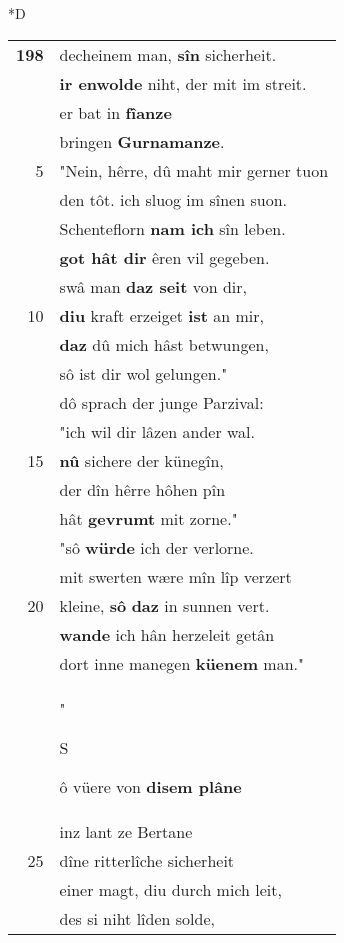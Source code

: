 \documentclass[8pt,a4paper,notitlepage]{article}
\begin{document}
\begin{table}[ht]
\begin{minipage}[t]{0.5\linewidth}
\small
\begin{center}*D
\end{center}
\begin{tabular}{rl}
\textbf{198} & decheinem man, \textbf{sîn} sicherheit.\\ 
 & \textbf{ir enwolde} niht, der mit im streit.\\ 
 & er bat in \textbf{fîanze}\\ 
 & bringen \textbf{Gurnamanze}.\\ 
5 & "Nein, hêrre, dû maht mir gerner tuon\\ 
 & den tôt. ich sluog im sînen suon.\\ 
 & Schenteflorn \textbf{nam ich} sîn leben.\\ 
 & \textbf{got hât dir} êren vil gegeben.\\ 
 & swâ man \textbf{daz seit} von dir,\\ 
10 & \textbf{diu} kraft erzeiget \textbf{ist} an mir,\\ 
 & \textbf{daz} dû mich hâst betwungen,\\ 
 & sô ist dir wol gelungen."\\ 
 & dô sprach der junge Parzival:\\ 
 & "ich wil dir lâzen ander wal.\\ 
15 & \textbf{nû} sichere der künegîn,\\ 
 & der dîn hêrre hôhen pîn\\ 
 & hât \textbf{gevrumt} mit zorne."\\ 
 & "sô \textbf{würde} ich der verlorne.\\ 
 & mit swerten wære mîn lîp verzert\\ 
20 & kleine, \textbf{sô} \textbf{daz} in sunnen vert.\\ 
 & \textbf{wande} ich hân herzeleit getân\\ 
 & dort inne manegen \textbf{küenem} man."\\ 
 & "\begin{large}S\end{large}ô vüere von \textbf{disem plâne}\\ 
 & inz lant ze Bertane\\ 
25 & dîne ritterlîche sicherheit\\ 
 & einer magt, diu durch mich leit,\\ 
 & des si niht lîden solde,\\ 

\end{tabular}
\end{minipage}
\end{table}
\end{document}
